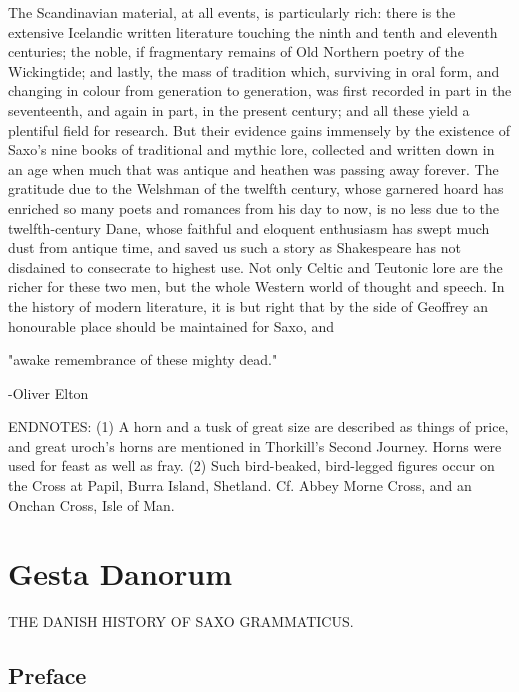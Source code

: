 \documentclass[10pt,a4paper]{report}
\begin{document}
The Scandinavian material, at all events, is particularly rich: there is the extensive Icelandic written literature touching the ninth and tenth and eleventh centuries; the noble, if fragmentary remains of Old Northern poetry of the Wickingtide; and lastly, the mass of tradition which, surviving in oral form, and changing in colour from generation to generation, was first recorded in part in the seventeenth, and again in part, in the present century; and all these yield a plentiful field for research. But their evidence gains immensely by the existence of Saxo's nine books of traditional and mythic lore, collected and written down in an age when much that was antique and heathen was passing away forever. The gratitude due to the Welshman of the twelfth century, whose garnered hoard has enriched so many poets and romances from his day to now, is no less due to the twelfth-century Dane, whose faithful and eloquent enthusiasm has swept much dust from antique time, and saved us such a story as Shakespeare has not disdained to consecrate to highest use. Not only Celtic and Teutonic lore are the richer for these two men, but the whole Western world of thought and speech. In the history of modern literature, it is but right that by the side of Geoffrey an honourable place should be maintained for Saxo, and

"awake remembrance of these mighty dead."

-Oliver Elton

     ENDNOTES:
     (1)  A horn and a tusk of great size are described as things of price, and great uroch's horns are mentioned in Thorkill's Second Journey.  Horns were used for feast as well as fray.
     (2)  Such bird-beaked, bird-legged figures occur on the Cross at Papil, Burra Island, Shetland.  Cf. Abbey Morne Cross, and an Onchan Cross, Isle of Man.


\part{Gesta Danorum}

THE DANISH HISTORY
OF SAXO GRAMMATICUS.

\chapter{Preface}
\end{document}
